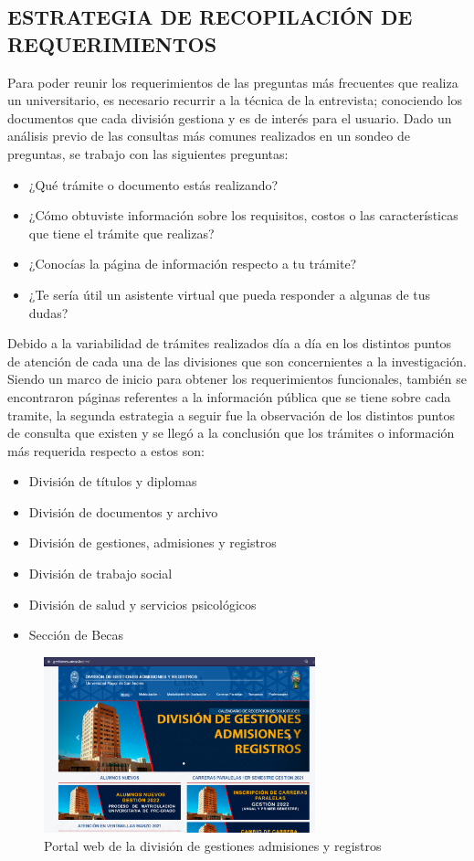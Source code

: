 \documentclass[letter, openright, 12pt]{book}
\newcommand*\setcaptioncitation[1]{\def\captioncitation{\textit{Fuente:}~#1}}
\let\captioncitation\relax
\begin{document}
\subsection{ESTRATEGIA DE RECOPILACIÓN DE REQUERIMIENTOS}
Para poder reunir los requerimientos de las preguntas más frecuentes que realiza un universitario, es necesario recurrir a la técnica de la entrevista; conociendo los documentos que cada división gestiona y es de interés para el usuario. Dado un análisis previo de las consultas más comunes realizados en un sondeo de preguntas, se trabajo con las siguientes preguntas: \par
\begin{itemize}
\item ¿Qué trámite o documento estás realizando?
\item ¿Cómo obtuviste información sobre los requisitos, costos o las características que tiene el trámite que realizas?
\item ¿Conocías la página de información respecto a tu trámite?
\item ¿Te sería útil un asistente virtual que pueda responder a algunas de tus dudas?
\end{itemize}
Debido a la variabilidad de trámites realizados día a día en los distintos puntos de atención de cada una de las divisiones que son concernientes a la investigación. Siendo un marco de inicio para obtener los requerimientos funcionales, también se encontraron páginas referentes a la información pública que se tiene sobre cada tramite, la segunda estrategia a seguir fue la observación de los distintos puntos de consulta que existen y se llegó a la conclusión que los trámites o información más requerida respecto a estos son: 
\begin{itemize}
\item División de títulos y diplomas
\item División de documentos y archivo
\item División de gestiones, admisiones y registros
\item División de trabajo social
\item División de salud y servicios psicológicos
\item Sección de Becas 
\end{itemize}

\begin{figure}[htb]
\centering
\includegraphics[width=0.7\textwidth]{figura3_2}
 \setcaptioncitation{(Portal GAR, 2022)}
 \caption{Portal web de la división de gestiones admisiones y registros}
\label{fig:figura3_2}
\end{figure}
\end{document}
